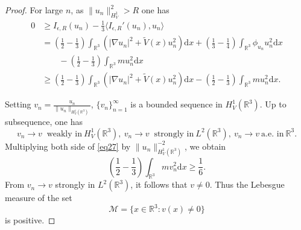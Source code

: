 \documentclass[12pt]{amsart}
\numberwithin{equation}{section}
\theoremstyle{definition}
\begin{document}
\begin{proof}
For large $n$, as $\|u_n\|_{H^1_{V}}^2>R$ one has 
\begin{equation}\label{eq27}
		\begin{split}
		0&\geq I_{\epsilon,R}(u_n)-\frac{1}{3}\langle I_{\epsilon,R}'(u_n),u_n\rangle\\
		&=\left(\frac{1}{2}-\frac{1}{3}\right)\int_{\mathbb R^3}\left(|\nabla u_n|^2+\tilde V(x)u_n^2\right)\text{d}x+\left(\frac{1}{3}-\frac{1}{4}\right)\int_{\mathbb R^3}\phi_{u_n}u_n^2\text{d}x\\
        &\quad\quad-\left(\frac{1}{2}-\frac{1}{3}\right)\int_{\mathbb{R}^3}m u^{2}_n\text{d}x\\
		&\geq\left(\frac{1}{2}-\frac{1}{3}\right)\int_{\mathbb R^3}\left(|\nabla u_n|^2+\tilde V(x)u_n^2\right)\text{d}x-\left(\frac{1}{2}-\frac{1}{3}\right)\int_{\mathbb{R}^3}m u^{2}_n\text{d}x.
	\end{split}\end{equation}

Setting $v_{n}=\frac{u_n}{\|u_n\|_{H^{1}_{V}(\mathbb{R}^3)}}$, $\{v_n\}_{n=1}^\infty$ is a bounded sequence in $H^{1}_{V}(\mathbb{R}^3)$. Up to subsequence, one has
\begin{equation*}
v_n\to v\ \mbox{ weakly in}\ H^{1}_{V}(\mathbb{R}^3),\ v_n\to v\ \mbox{ strongly in}\ L^{2}(\mathbb{R}^3),\ v_n\to v\ \mbox{a.e. in}\ \mathbb{R}^3.
\end{equation*}
Multiplying both side of \eqref{eq27} by $\|u_n\|^{-2}_{H^{1}_{V}(\mathbb{R}^3)}$, we obtain\\
\begin{equation*}
\left(\frac{1}{2}-\frac{1}{3}\right)\int_{\mathbb{R}^3}m v^{2}_n\text{d}x\geq\frac{1}{6}.
\end{equation*}
From $v_n\to v$ strongly in $L^{2}(\mathbb{R}^3)$, it follows that $v\neq0$. Thus the Lebesgue measure of the set
$$\mathcal{M}=\{x\in\mathbb{R}^3:v(x)\neq 0\}$$
is positive.


\end{proof}
\end{document}

